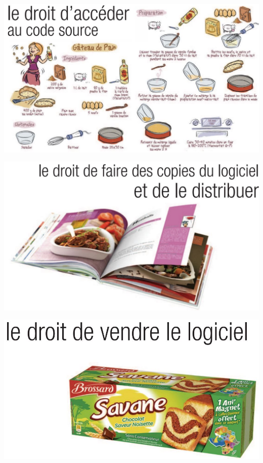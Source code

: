 \documentclass{beamer}
\begin{document}
\begin{frame}
\includegraphics[scale=0.6] {./images/Cuisine01.jpg} 
\end{frame}
\begin{frame}
\includegraphics[scale=0.5] {./images/Cuisine02.jpg} 
\end{frame}
\begin{frame}
\includegraphics[scale=0.6] {./images/Cuisine03.jpg} 
\end{frame}
\end{document}
